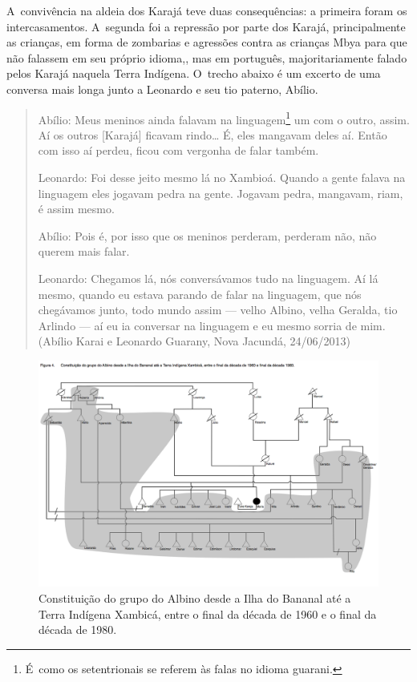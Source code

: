 A~convivência na aldeia dos Karajá teve duas consequências: a primeira
foram os intercasamentos. A~segunda foi a repressão por parte dos
Karajá, principalmente as crianças, em forma de zombarias e agressões
contra as crianças Mbya para que não falassem em seu próprio idioma,,
mas em português, majoritariamente falado pelos Karajá naquela Terra
Indígena. O~trecho abaixo é um excerto de uma conversa mais longa junto
a Leonardo e seu tio paterno, Abílio. 

\begin{quote}
\noindent
Abílio: Meus meninos ainda falavam na linguagem\footnote{É~como os
setentrionais se referem às falas no idioma guarani.} um com o outro,
assim. Aí os outros [Karajá] ficavam rindo\ldots{} É, eles mangavam deles
aí. Então com isso aí perdeu, ficou com vergonha de falar também.

Leonardo: Foi desse jeito mesmo lá no Xambioá. Quando a gente falava na
linguagem eles jogavam pedra na gente. Jogavam pedra, mangavam, riam, é
assim mesmo. 

Abílio: Pois é, por isso que os meninos perderam, perderam não, não
querem mais falar.

Leonardo: Chegamos lá, nós conversávamos tudo na linguagem. Aí lá mesmo,
quando eu estava parando de falar na linguagem, que nós chegávamos
junto, todo mundo assim --- velho Albino, velha Geralda, tio Arlindo --- aí
eu ia conversar na linguagem e eu mesmo sorria de mim. (Abílio Karai e
Leonardo Guarany, Nova Jacundá, 24/06/2013)
\end{quote}

\begin{figure}
  \centering
 \includegraphics[width=\textwidth]{./img/GUARANIS-img12.png}	
  \hfill
  \caption{Constituição do grupo do Albino desde a Ilha do Bananal até a Terra Indígena Xambicá, entre o final da década de 1960 e o final da década de 1980.}
\end{figure}
 


